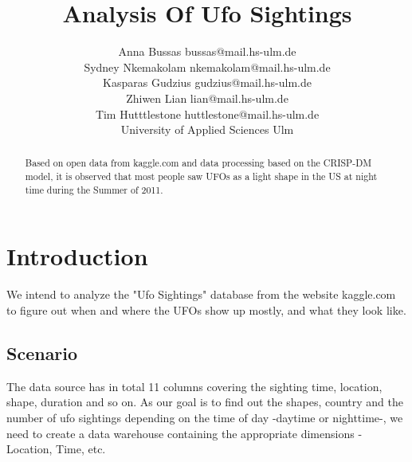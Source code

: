 \documentclass[11pt, journal]{IEEEtran}
\begin{document}
%
\title{Analysis Of Ufo Sightings}


\author{ \parbox{3 in}{\centering Anna Bussas bussas@mail.hs-ulm.de\\
Sydney Nkemakolam nkemakolam@mail.hs-ulm.de\\
Kasparas Gudzius gudzius@mail.hs-ulm.de\\
Zhiwen Lian lian@mail.hs-ulm.de\\
Tim Hutttlestone huttlestone@mail.hs-ulm.de\\
				 University of Applied Sciences Ulm\\
 }
}






\maketitle

\begin{abstract}
Based on open data from kaggle.com and data processing based on the CRISP-DM model, it is observed that most people saw UFOs as a light shape in the US at night time during the Summer of 2011. 
\end{abstract}


\section{Introduction}
\label{sec:intro}
We intend to analyze the "Ufo Sightings" database from
the website kaggle.com to figure out when and where the UFOs show up mostly, and what they look like. 
\subsection{Scenario} \label{subsec:scenario}
The data source has in total 11 columns covering the sighting time, location, shape, duration and so on. As our goal is to find out the shapes, country and the number of ufo sightings depending on the time of day -daytime or nighttime-, we need to create a data warehouse containing the appropriate dimensions - Location, Time, etc.
\end{document}
